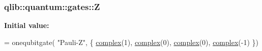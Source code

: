 \subsubsection[{\texorpdfstring{Z}{Z}}]{ qlib\+::quantum\+::gates\+::Z}\hypertarget{namespaceqlib_1_1quantum_1_1gates_ad07d8c867d0463c3f66dfa80d5b6b53c}{}\label{namespaceqlib_1_1quantum_1_1gates_ad07d8c867d0463c3f66dfa80d5b6b53c}
{\bfseries Initial value\+:}
\begin{DoxyCode}
= onequbitgate(
    \textcolor{stringliteral}{"Pauli-Z"}, 
    \{
        \hyperlink{classqlib_1_1math_1_1complex}{complex}(1), \hyperlink{classqlib_1_1math_1_1complex}{complex}(0),
        \hyperlink{classqlib_1_1math_1_1complex}{complex}(0), \hyperlink{classqlib_1_1math_1_1complex}{complex}(-1)
    \})
\end{DoxyCode}
